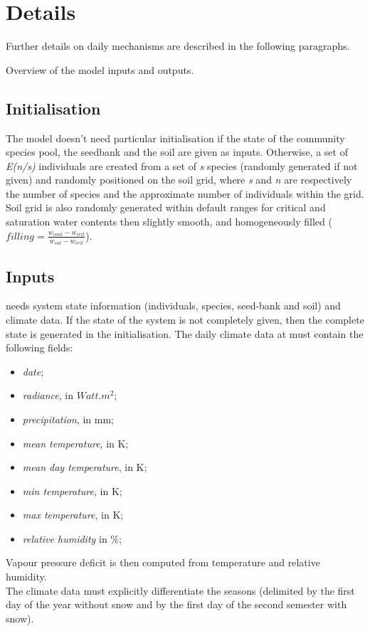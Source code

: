 \section{Details}

Further details on daily mechanisms are described in the following paragraphs.


\begin{marginfigure}
\caption{Overview of the model inputs and outputs.}
\end{marginfigure}

\subsection{Initialisation}
The model doesn't need particular initialisation if the state of the community species pool, the seedbank and the soil are given as inputs. Otherwise, a set of \textit{E(n/s)} individuals are created from a set of \textit{s} species (randomly generated if not given) and randomly positioned on the soil grid, where \textit{s} and \textit{n} are respectively the number of species and the approximate number of individuals within the grid. Soil grid is also randomly generated within default ranges for critical and saturation water contents then slightly smooth, and homogeneously filled ($filling = \frac{w_{cont} - w_{crit}}{w_{sat} - w_{crit}}$).

\subsection{Inputs}
\model needs system state information (individuals, species, seed-bank and soil) and climate data. If the state of the system is not completely given, then the complete state is generated in the initialisation. The daily climate data at must contain the following fields:
\begin{itemize}
\setlength\itemsep{0em}
\item \textit{date};
\item \textit{radiance}, in $Watt.m^{2}$;
\item \textit{precipitation}, in mm;
\item \textit{mean temperature}, in K;
\item \textit{mean day temperature}, in K;
\item \textit{min temperature}, in K;
\item \textit{max temperature}, in K;
\item \textit{relative humidity} in \%;
\end{itemize}
Vapour pressure deficit is then computed from temperature and relative humidity.\\
\indent The climate data must explicitly differentiate the seasons (delimited by the first day of the year without snow and by the first day of the second semester with snow).

